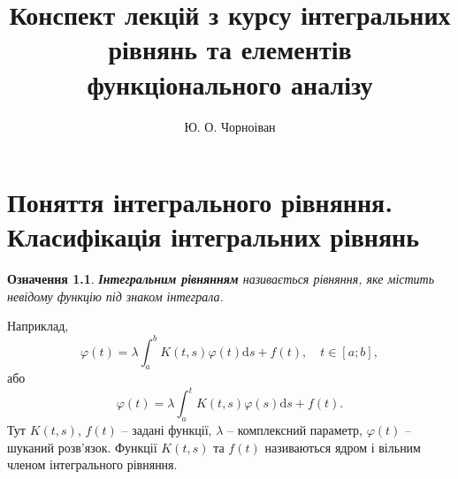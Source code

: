 \documentclass[14pt,twoside]{extreport}
\title{\huge Конспект лекцій з курсу інтегральних рівнянь та елементів функціонального аналізу}
\author{Ю. О. Чорноіван}
\theoremstyle{mystyle}
\newtheorem{dfn}{Означення}
\numberwithin{equation}{chapter}
\begin{document}
\maketitle
\tableofcontents
\newpage
\sloppy

\chapter{Поняття інтегрального рівняння. Класифікація інтегральних рівнянь}

\begin{dfn}
\textbf{Інтегральним рівнянням} називається рівняння, яке містить невідому функцію під знаком інтеграла.
\end{dfn}
Наприклад,
\begin{equation} \label{inteqfred2kind}
\varphi (t)=\lambda \int _{a}^{b} K(t, s)\varphi (t)\mathrm{d}s+f(t), \quad t\in [a;b],
\end{equation}
або
\begin{equation} \label{inteqvolt2kind}
\varphi (t)=\lambda \int _{a}^{t} K(t, s)\varphi (s)\mathrm{d}s+f(t).
\end{equation}
Тут $K(t, s)$, $f(t)$ -- задані функції, $\lambda$ -- комплексний параметр, $\varphi (t)$ -- шуканий розв'язок. Функції $K(t, s)$ та $f(t)$ називаються ядром і вільним членом інтегрального рівняння.
\end{document}

